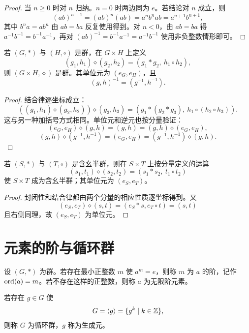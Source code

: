 \begin{proof}
  当 $n\ge0$ 时对 $n$ 归纳。$n=0$ 时两边同为 $e$。若结论对 $n$ 成立，则
  \[
  (ab)^{n+1}=(ab)^n(ab)=a^nb^nab=a^{n+1}b^{n+1},
  \]
  其中 $b^na=ab^n$ 由 $ab=ba$ 反复使用得到。对 $n<0$，由
  $ab=ba$ 得 $a^{-1}b^{-1}=b^{-1}a^{-1}$，再对
  $(ab)^{-1}=b^{-1}a^{-1}=a^{-1}b^{-1}$ 使用非负整数情形即可。
\end{proof}

\begin{theorem}[群的直接积]\label{group-direct-product}
  若 $(G,*)$ 与 $(H,\circ)$ 是群，在 $G\times H$ 上定义
  \[
  (g_1,h_1)\diamond(g_2,h_2)=(g_1*g_2,\ h_1\circ h_2),
  \]
  则 $(G\times H,\diamond)$ 是群。其单位元为 $(e_G,e_H)$，且
  \[
  (g,h)^{-1}=(g^{-1},h^{-1}).
  \]
\end{theorem}

\begin{proof}
  结合律逐坐标成立：
  \[
  ((g_1,h_1)\diamond(g_2,h_2))\diamond(g_3,h_3)
  =(g_1*(g_2*g_3),\ h_1\circ(h_2\circ h_3)).
  \]
  这与另一种加括号方式相同。单位元和逆元也按分量验证：
  \[
  (e_G,e_H)\diamond(g,h)=(g,h)=(g,h)\diamond(e_G,e_H),
  \]
  \[
  (g,h)\diamond(g^{-1},h^{-1})=(e_G,e_H)
  =(g^{-1},h^{-1})\diamond(g,h).
  \]
\end{proof}

\begin{theorem}[含幺半群的直接积]\label{monoid-direct-product}
  若 $(S,*)$ 与 $(T,\circ)$ 是含幺半群，则在 $S\times T$ 上按分量定义的运算
  \[
  (s_1,t_1)\diamond(s_2,t_2)=(s_1*s_2,\ t_1\circ t_2)
  \]
  使 $S\times T$ 成为含幺半群；其单位元为 $(e_S,e_T)$。
\end{theorem}

\begin{proof}
  封闭性和结合律都由两个分量的相应性质逐坐标得到。又
  \[
  (e_S,e_T)\diamond(s,t)=(e_S*s,e_T\circ t)=(s,t)
  \]
  且右侧同理，故 $(e_S,e_T)$ 为单位元。
\end{proof}

\section{元素的阶与循环群}

\begin{definition}[元素的阶与循环群]\label{order-cyclic}
  设 $(G,*)$ 为群。若存在最小正整数 $m$ 使 $a^m=e$，则称 $m$ 为 $a$ 的阶，记作 $\operatorname{ord}(a)=m$。若不存在这样的正整数，则称 $a$ 为无限阶元素。

  若存在 $g\in G$ 使
  \[
  G=\langle g\rangle=\{g^k\mid k\in\mathbb{Z}\},
  \]
  则称 $G$ 为循环群，$g$ 称为生成元。
\end{definition}

